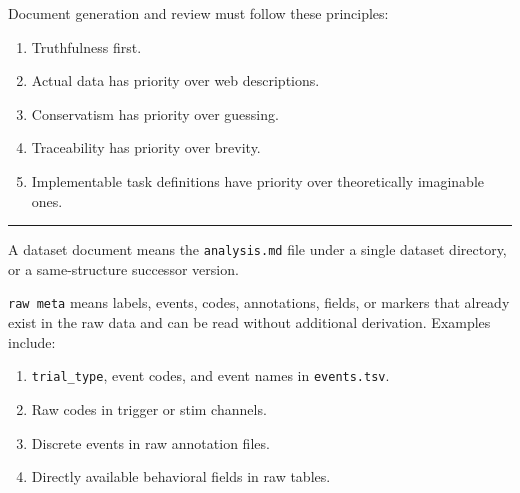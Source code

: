 \begin{tcolorbox}
\smallskip{}\par\smallskip

\noindent Document generation and review must follow these principles:\par\smallskip

\begin{enumerate}[leftmargin=1.5em,noitemsep,topsep=2pt]
\item Truthfulness first.
\item Actual data has priority over web descriptions.
\item Conservatism has priority over guessing.
\item Traceability has priority over brevity.
\item Implementable task definitions have priority over theoretically imaginable ones.
\end{enumerate}

\medskip{}
\par\nopagebreak\noindent\rule{\linewidth}{0.4pt}\par\smallskip

\smallskip{}\par\smallskip

\noindent A dataset document means the \texttt{analysis.md} file under a single dataset directory, or a same-structure successor version.\par\smallskip

\smallskip{}\par\smallskip

\noindent \texttt{raw meta} means labels, events, codes, annotations, fields, or markers that already exist in the raw data and can be read without additional derivation. Examples include:\par\smallskip

\begin{enumerate}[leftmargin=1.5em,noitemsep,topsep=2pt]
\item \texttt{trial\_type}, event codes, and event names in \texttt{events.tsv}.
\item Raw codes in trigger or stim channels.
\item Discrete events in raw annotation files.
\item Directly available behavioral fields in raw tables.
\end{enumerate}


\end{tcolorbox}
